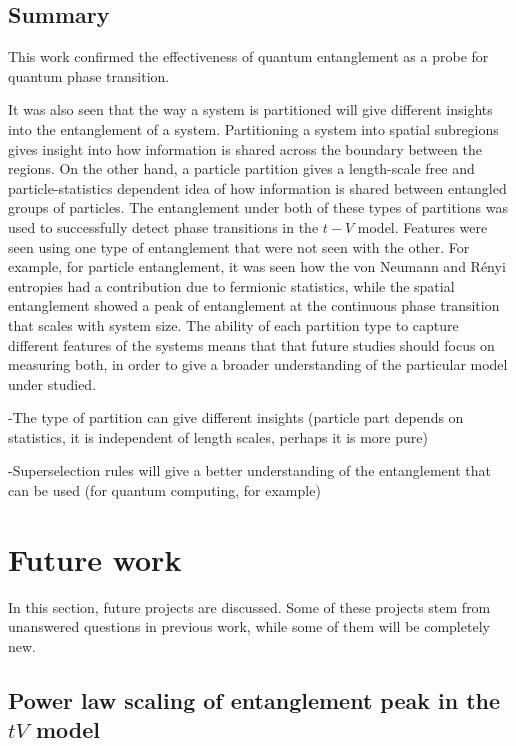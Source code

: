 \subsection{Summary}

This work confirmed the effectiveness of quantum entanglement as a probe for quantum phase transition.

It was also seen that the way a system is partitioned will give different insights into the entanglement of a system. Partitioning a system into spatial subregions gives insight into how information is shared across the boundary between the regions. On the other hand, a particle partition gives a length-scale free and particle-statistics dependent idea of how information is shared between entangled groups of particles. The entanglement under both of these types of partitions was used to successfully detect phase transitions in the $t-V$ model. Features were seen using one type of entanglement that were not seen with the other. For example, for particle entanglement, it was seen how the von Neumann and R\'enyi entropies had a contribution due to fermionic statistics, while the spatial entanglement showed a peak of entanglement at the continuous phase transition that scales with system size. The ability of each partition type to capture different features of the systems means that that future studies should focus on measuring both, in order to give a broader understanding of the particular model under studied.

-The type of partition can give different insights (particle part depends on statistics, it is independent of length scales, perhaps it is more pure)

-Superselection rules will give a better understanding of the entanglement that can be used (for quantum computing, for example)
 
\section{Future work}

	In this section, future projects are discussed. Some of these projects stem from unanswered questions in previous work, while some of them will be completely new.
	
	\subsection{Power law scaling of entanglement peak in the $tV$ model}
	
